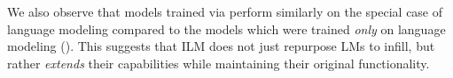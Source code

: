We also observe that models trained via \ilm{} perform similarly on the special case of language modeling compared to the models which were trained \emph{only} on language modeling 
(). 
This suggests that ILM does not just repurpose LMs to infill, but rather \emph{extends} their capabilities while maintaining their original functionality.